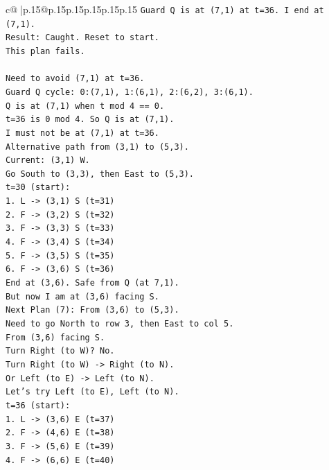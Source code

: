 \documentclass{article}
\begin{document}
{\begin{supertabular}{c@{$\;$}|p{.15\linewidth}@{}p{.15\linewidth}p{.15\linewidth}p{.15\linewidth}p{.15\linewidth}p{.15\linewidth}}
{{{\texttt{Guard Q is at (7,1) at t=36. I end at (7,1).} \\
\texttt{Result: Caught. Reset to start.} \\
\texttt{This plan fails.} \\
\\ 
\texttt{Need to avoid (7,1) at t=36.} \\
\texttt{Guard Q cycle: 0:(7,1), 1:(6,1), 2:(6,2), 3:(6,1).} \\
\texttt{Q is at (7,1) when t mod 4 == 0.} \\
\texttt{t=36 is 0 mod 4. So Q is at (7,1).} \\
\texttt{I must not be at (7,1) at t=36.} \\
\texttt{Alternative path from (3,1) to (5,3).} \\
\texttt{Current: (3,1) W.} \\
\texttt{Go South to (3,3), then East to (5,3).} \\
\texttt{t=30 (start):} \\
\texttt{1. L {-}> (3,1) S (t=31)} \\
\texttt{2. F {-}> (3,2) S (t=32)} \\
\texttt{3. F {-}> (3,3) S (t=33)} \\
\texttt{4. F {-}> (3,4) S (t=34)} \\
\texttt{5. F {-}> (3,5) S (t=35)} \\
\texttt{6. F {-}> (3,6) S (t=36)} \\
\texttt{End at (3,6). Safe from Q (at 7,1).} \\
\texttt{But now I am at (3,6) facing S.} \\
\texttt{Next Plan (7): From (3,6) to (5,3).} \\
\texttt{Need to go North to row 3, then East to col 5.} \\
\texttt{From (3,6) facing S.} \\
\texttt{Turn Right (to W)? No.} \\
\texttt{Turn Right (to W) {-}> Right (to N).} \\
\texttt{Or Left (to E) {-}> Left (to N).} \\
\texttt{Let's try Left (to E), Left (to N).} \\
\texttt{t=36 (start):} \\
\texttt{1. L {-}> (3,6) E (t=37)} \\
\texttt{2. F {-}> (4,6) E (t=38)} \\
\texttt{3. F {-}> (5,6) E (t=39)} \\
\texttt{4. F {-}> (6,6) E (t=40)} \\
}}}
\end{supertabular}}
\end{document}

